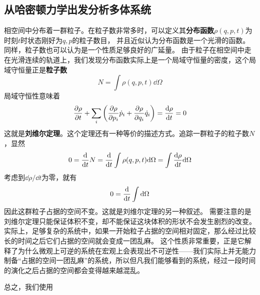 \documentclass[UTF8, a4paper]{ctexart}
\begin{document}
\subsection{从哈密顿力学出发分析多体系统}

相空间中分布着一群粒子。在粒子数非常多时，可以定义其\textbf{分布函数}$\rho(q, p, t)$为时刻$t$时状态刚好为$q, p$的粒子数目，
并且近似认为分布函数是一个光滑的函数。同样，粒子数也可以认为是一个性质足够良好的广延量。
由于粒子在相空间中走在光滑连续的轨道上，我们发现分布函数实际上是一个局域守恒量的密度，这个局域守恒量正是\textbf{粒子数}
\begin{equation}
    N = \int \rho(q,p,t) \dd \Omega
\end{equation}
局域守恒性意味着
\begin{equation}
    \pdv{\rho}{t} + \sum_i \left( \pdv{\rho}{p_i} \dot{p}_i + \pdv{\rho}{q_i} \dot{q}_i \right) = \dv{\rho}{t} = 0
\end{equation}
这就是\textbf{刘维尔定理}。这个定理还有一种等价的描述方式。追踪一群粒子的粒子数$N$，显然
\[
    0 = \dv{t} N = \dv{t} \int \rho(q,p,t) \dd \Omega = \int \dv{\rho}{t} \dd \Omega
\]
考虑到$\dd \rho / \dd t$为零，就有
\[
    0 = \dv{t} \int \dd \Omega
\]
因此这群粒子占据的空间不变。这就是刘维尔定理的另一种叙述。
需要注意的是刘维尔定理只能保证体积不变，却不能保证这块体积的形状不会发生剧烈的改变。
实际上，足够复杂的系统中，如果一开始粒子占据的空间相对固定，那么经过比较长的时间之后它们占据的空间就会变成一团乱麻。
这个性质非常重要，正是它解释了为什么微观上可逆的系统在宏观上会表现出不可逆性——我们实际上并无能力制备“占据的空间一团乱麻”的系统，所以但凡我们能够看到的系统，经过一段时间的演化之后占据的空间都会变得越来越混乱。

总之，我们使用
\end{document}
